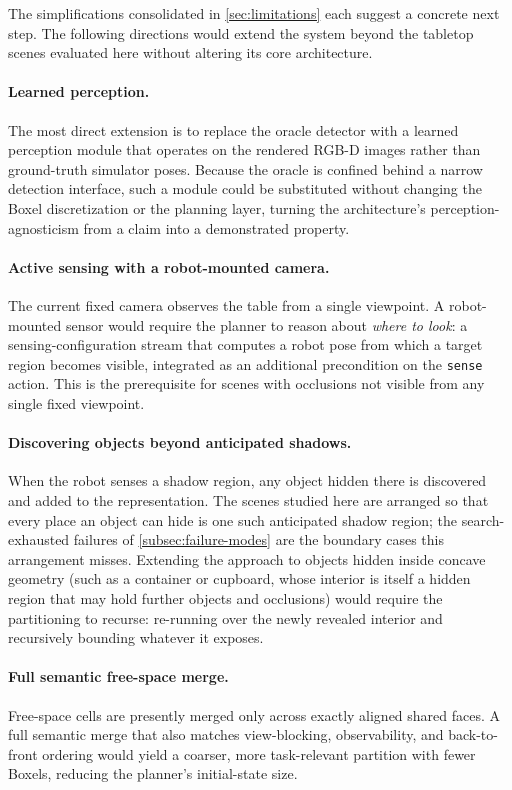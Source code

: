 The simplifications consolidated in \cref{sec:limitations} each suggest a
concrete next step. The following directions would extend the system beyond
the tabletop scenes evaluated here without altering its core architecture.

\paragraph{Learned perception.} The most direct extension is to replace the
oracle detector with a learned perception module that operates on the
rendered RGB-D images rather than ground-truth simulator poses. Because the
oracle is confined behind a narrow detection interface, such a module could
be substituted without changing the Boxel discretization or the planning
layer, turning the architecture's perception-agnosticism from a claim into
a demonstrated property.

\paragraph{Active sensing with a robot-mounted camera.} The current fixed
camera observes the table from a single viewpoint. A robot-mounted sensor
would require the planner to reason about \emph{where to look}: a
sensing-configuration stream that computes a robot pose from which a target
region becomes visible, integrated as an additional precondition on the
\texttt{sense} action. This is the prerequisite for scenes with occlusions
not visible from any single fixed viewpoint.

\paragraph{Discovering objects beyond anticipated shadows.} When the robot
senses a shadow region, any object hidden there is discovered and added to
the representation. The scenes studied here are arranged so that every place an
object can hide is one such anticipated shadow region; the
search-exhausted failures of \cref{subsec:failure-modes} are the
boundary cases this arrangement misses. Extending
the approach to objects hidden inside concave geometry (such as a
container or cupboard, whose interior is itself a hidden region that may
hold further objects and occlusions) would require the partitioning to
recurse: re-running over the newly revealed interior and recursively
bounding whatever it exposes.

\paragraph{Full semantic free-space merge.} Free-space cells are presently
merged only across exactly aligned shared faces. A full semantic merge that
also matches view-blocking, observability, and back-to-front ordering would
yield a coarser, more task-relevant partition with fewer Boxels, reducing
the planner's initial-state size.

